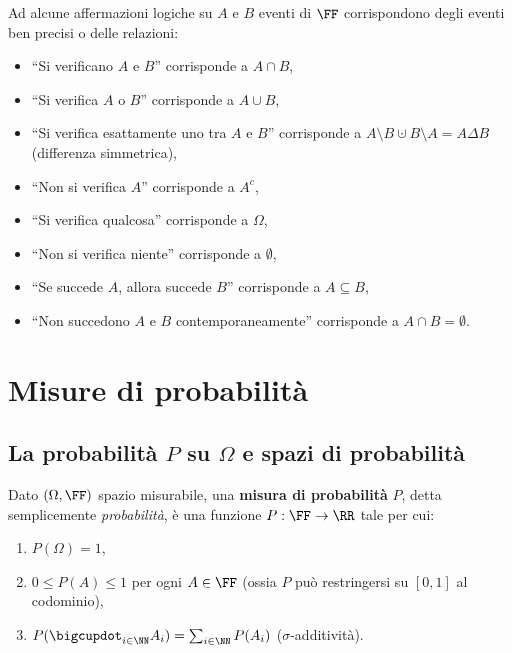 \begin{multicols*}{2}
    \begin{remark}
        Ad alcune affermazioni logiche su $A$ e $B$ eventi di $\FF$ corrispondono degli eventi ben precisi o delle
        relazioni:
        \begin{itemize}
            \item ``Si verificano $A$ e $B$'' corrisponde a $A \cap B$,
            \item ``Si verifica $A$ o $B$'' corrisponde a $A \cup B$,
            \item ``Si verifica esattamente uno tra $A$ e $B$'' corrisponde a $A \setminus B \cupdot B \setminus A = A \Delta B$ (differenza simmetrica),
            \item ``Non si verifica $A$'' corrisponde a $A^c$,
            \item ``Si verifica qualcosa'' corrisponde a $\Omega$,
            \item ``Non si verifica niente'' corrisponde a $\emptyset$,
            \item ``Se succede $A$, allora succede $B$'' corrisponde a $A \subseteq B$,
            \item ``Non succedono $A$ e $B$ contemporaneamente'' corrisponde a
                $A \cap B = \emptyset$.
        \end{itemize}
    \end{remark}

    \section{Misure di probabilità}

    \subsection{La probabilità \texorpdfstring{$P$}{P} su \texorpdfstring{$\Omega$}{Ω} e spazi di probabilità}

    \begin{definition}
        Dato $(\Omega, \FF)$ spazio misurabile, una \textbf{misura
        di probabilità} $P$, detta semplicemente \textit{probabilità},
        è una funzione $P : \FF \to \RR$ tale per cui:

        \begin{enumerate}[(i.)]
            \item $P(\Omega) = 1$,
            \item $0 \leq P(A) \leq 1$ per ogni $A \in \FF$ (ossia $P$ può restringersi su $[0, 1]$ al codominio),
            \item $P(\bigcupdot_{i \in \NN} A_i) = \sum_{i \in \NN} P(A_i)$ ($\sigma$-additività).
        \end{enumerate}


\end{definition}
\end{multicols*}
